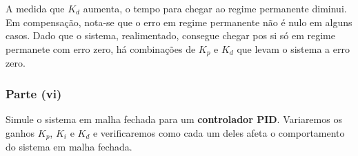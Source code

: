 \documentclass[a4paper, 12pt]{article}
\begin{document}
A medida que $K_d$ aumenta, o tempo para chegar ao regime permanente diminui. Em compensação, nota-se que o erro em regime permanente não é nulo em alguns casos. Dado que o sistema, realimentado, consegue chegar pos si só em regime permanete com erro zero, há combinações de $K_p$ e $K_d$ que levam o sistema a erro zero.

\subsubsection{Parte (vi)}
Simule o sistema em malha fechada para um \textbf{controlador PID}. Variaremos os ganhos $K_p$, $K_i$ e $K_d$ e verificaremos como cada um deles afeta o comportamento do sistema em malha fechada.

\sloppy
{}
\graphicspath{ {./lista8_lab_servomec_images/} }

\matlabheadingtwo{\color{blue}{Questão 1 - Parte (vi)}}
\end{document}
